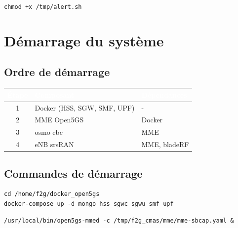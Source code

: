\documentclass[11pt,a4paper]{article}
\begin{document}
\begin{cmdbox}
\begin{lstlisting}[style=bashstyle]
chmod +x /tmp/alert.sh
\end{lstlisting}
\end{cmdbox}

\newpage

\section{Démarrage du système}

\subsection{Ordre de démarrage}

\begin{center}
\begin{tabular}{|c|l|l|}
\hline
\rowcolor{pkfblue}
\textcolor{white}{\textbf{Étape}} & \textcolor{white}{\textbf{Composant}} & \textcolor{white}{\textbf{Dépendances}} \\
\hline
1 & Docker (HSS, SGW, SMF, UPF) & - \\
\hline
2 & MME Open5GS & Docker \\
\hline
3 & osmo-cbc & MME \\
\hline
4 & eNB srsRAN & MME, bladeRF \\
\hline
\end{tabular}
\end{center}

\subsection{Commandes de démarrage}

\begin{cmdbox}
\begin{lstlisting}[style=bashstyle]
cd /home/f2g/docker_open5gs
docker-compose up -d mongo hss sgwc sgwu smf upf
\end{lstlisting}
\end{cmdbox}

\begin{cmdbox}
\begin{lstlisting}[style=bashstyle]
/usr/local/bin/open5gs-mmed -c /tmp/f2g_cmas/mme/mme-sbcap.yaml &
\end{lstlisting}
\end{cmdbox}
\end{document}
